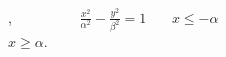 \\
\textGamma \textepsilon \textn \textiota \textkappa \textomicron \texttau \textepsilon \textrho \textalpha, \ \textepsilon \textiota \textn \textalpha \textiota \ \textgamma \textn \textomega \textsigma \texttau \textomicron \ \textomicron \texttau \textiota \ \textgamma \textiota \textalpha \ \textmu \textiota \textalpha \ \textupsilon \textpi \textepsilon \textrho \textbeta \textomicron \textbb \textomicron \textbb \texteta \ \textmu \textepsilon \ \textepsilon \textxi \textiota \textsigma \textomega \textsigma \texteta \ $\frac{x^2}{\alpha^2} - \frac{y^2}{\beta^2}=1$ \ \textiota \textsigma \textchi \textupsilon \textepsilon \textiota \ \textomicron \texttau \textiota \ $x \le -\alpha$ \ \texteta \ \\
$x \ge \alpha$.
\endsyh